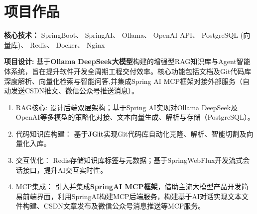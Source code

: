\documentclass{resume}
\begin{document}
\section{项目作品}
  \vspace{0.1cm}
\begin{itemize}
  {\small

  \vspace{0.1cm}
  \item \textbf{核心技术：}  SpringBoot、 SpringAI、 Ollama、 OpenAI API、 PostgreSQL (向量库)、 Redis、 Docker、 Nginx

  \vspace{0.1cm}
  \item \textbf{项目设计:} 基于\textbf{Ollama DeepSeek大模型}构建的增强型RAG知识库与Agent智能体系统，旨在提升软件开发全周期工程交付效率。核心功能包括文档及Git代码库深度解析、向量化检索与智能问答,并集成Spring AI MCP框架对接外部服务（自动发送CSDN推文、微信公众号推送消息）。

 \begin{enumerate}[leftmargin = 0.3em, topsep=2pt, itemsep=0pt, parsep=0pt]
  \item  RAG核心: 设计后端双层架构；基于Spring AI实现对Ollama DeepSeek及OpenAI等多模型的策略化对接、文本向量生成、解析与存储（PostgreSQL）。

  \vspace{0.1cm}
  \item 代码知识库构建： 基于\textbf{JGit}实现Git代码库自动化克隆、解析、智能切割及向量化入库。
  \vspace{0.1cm}
  \item 交互优化： Redis存储知识库标签与元数据；基于SpringWebFlux开发流式会话接口，提升AI交互实时性。
  \vspace{0.1cm}
  \item MCP集成： 引入并集成\textbf{SpringAI MCP框架}，借助主流大模型产品开发简易前端界面，利用SpringAI构建MCP后端服务，构建基于AI对话实现文本文件构建、CSDN文章发布及微信公众号消息推送等MCP服务。
  \vspace{0.1cm}
 \end{enumerate}


  }
\end{itemize}

  \vspace{0.2cm}
\end{document}
